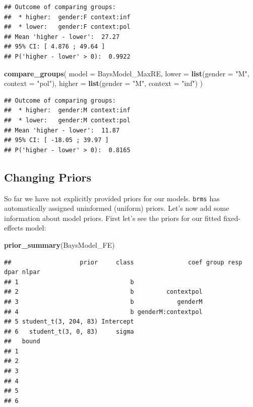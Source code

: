 \documentclass[]{book}
\newenvironment{Shaded}{\begin{snugshade}}{\end{snugshade}}
\newcommand{\DataTypeTok}[1]{\textcolor[rgb]{0.13,0.29,0.53}{#1}}
\newcommand{\KeywordTok}[1]{\textcolor[rgb]{0.13,0.29,0.53}{\textbf{#1}}}
\newcommand{\NormalTok}[1]{#1}
\newcommand{\StringTok}[1]{\textcolor[rgb]{0.31,0.60,0.02}{#1}}
\begin{document}
\begin{verbatim}
## Outcome of comparing groups:
##  * higher:  gender:F context:inf 
##  * lower:   gender:F context:pol 
## Mean 'higher - lower':  27.27 
## 95% CI: [ 4.876 ; 49.64 ]
## P('higher - lower' > 0):  0.9922
\end{verbatim}

\begin{Shaded}
\begin{Highlighting}[]
\KeywordTok{compare_groups}\NormalTok{(}
  \DataTypeTok{model =}\NormalTok{ BaysModel_MaxRE, }
  \DataTypeTok{lower =} \KeywordTok{list}\NormalTok{(}\DataTypeTok{gender =} \StringTok{"M"}\NormalTok{, }\DataTypeTok{context =} \StringTok{"pol"}\NormalTok{), }
  \DataTypeTok{higher =} \KeywordTok{list}\NormalTok{(}\DataTypeTok{gender =} \StringTok{"M"}\NormalTok{, }\DataTypeTok{context =} \StringTok{"inf"}\NormalTok{)}
\NormalTok{)}
\end{Highlighting}
\end{Shaded}

\begin{verbatim}
## Outcome of comparing groups:
##  * higher:  gender:M context:inf 
##  * lower:   gender:M context:pol 
## Mean 'higher - lower':  11.87 
## 95% CI: [ -18.05 ; 39.97 ]
## P('higher - lower' > 0):  0.8165
\end{verbatim}

\hypertarget{changing-priors}{%
\subsection{Changing Priors}\label{changing-priors}}

So far we have not explicitly provided priors for our models. \texttt{brms} has automatically assigned uninformed (uniform) priors. Let's now add some information about model priors. First let's see the priors for our fitted fixed-effects model:

\begin{Shaded}
\begin{Highlighting}[]
\KeywordTok{prior_summary}\NormalTok{(BaysModel_FE)}
\end{Highlighting}
\end{Shaded}

\begin{verbatim}
##                   prior     class               coef group resp dpar nlpar
## 1                               b                                         
## 2                               b         contextpol                      
## 3                               b            genderM                      
## 4                               b genderM:contextpol                      
## 5 student_t(3, 204, 83) Intercept                                         
## 6   student_t(3, 0, 83)     sigma                                         
##   bound
## 1      
## 2      
## 3      
## 4      
## 5      
## 6
\end{verbatim}
\end{document}
